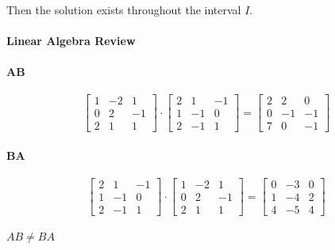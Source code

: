 \documentclass{article}
\begin{document}
\paragraph{}Then the solution exists throughout the interval $I$.
\paragraph{Linear Algebra Review}
\paragraph{AB}

\[
    \begin{bmatrix}
        1 & -2 & 1 \\ 
        0 & 2 & -1 \\
        2 & 1 & 1 
    \end{bmatrix}
    \cdot
    \begin{bmatrix}
        2 & 1 & -1 \\
        1 & -1 & 0 \\
        2 & -1 & 1
    \end{bmatrix}
    =
    \begin{bmatrix}
        2 & 2 & 0\\
        0 & -1 & -1 \\
        7& 0 & -1 
    \end{bmatrix}
\]
\paragraph{BA}
\[
    \begin{bmatrix}
        2 & 1 & -1 \\
        1 & -1 & 0 \\
        2 & -1 & 1
    \end{bmatrix}
    \cdot 
    \begin{bmatrix}
        1 & -2 & 1 \\ 
        0 & 2 & -1 \\
        2 & 1 & 1 
    \end{bmatrix}
    = 
     \begin{bmatrix}
        0 & -3 & 0 \\ 
        1 & -4 & 2 \\
        4 & -5 & 4 
    \end{bmatrix} 
\]
\paragraph{$AB \ne BA$}
\end{document}
